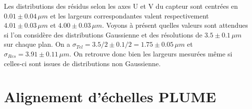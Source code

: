   
   Les distributions des r\'esidus selon les axes U et V du capteur sont centr\'ees en $0.01 \pm 0.04 \, \mu m$  et les largeurs correspondantes valent respectivement $4.01 \pm 0.03 \, \mu m$ et $4.00 \pm 0.03 \, \mu m$. Voyons \`a pr\'esent quelles valeurs sont attendues si l'on consid\`ere des distributions Gaussienne et des r\'esolutions de $3.5 \pm 0.1 \, \mu m$ sur chaque plan. On a $\sigma_{Tel} = 3.5/2 \pm 0.1/2 = 1.75 \pm 0.05 \, \mu m$ et $\sigma_{Res} = 3.91 \pm 0.11 \, \mu m$. On retrouve donc bien les largeurs mesur\'ees m\^eme si celles-ci sont issues de distributions non Gaussienne.
  
%    
   
   
    
   \section{Alignement d'\'echelles PLUME}
   
